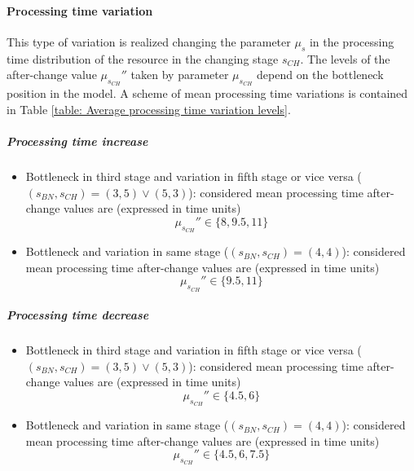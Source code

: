 \paragraph{Processing time variation}
This type of variation is realized changing the parameter $\mu_s$ in the processing time distribution of the resource in the changing stage $s_{CH}$. The levels of the after-change value $\mu_{s_{CH}}''$ taken by parameter $\mu_{s_{CH}}$ depend on the bottleneck position in the model. A scheme of mean processing time variations is contained in Table \ref{table: Average processing time variation levels}.
\subparagraph{Processing time increase} 
\begin{itemize}
\item Bottleneck in third stage and variation in fifth stage or vice versa ($(s_{BN},s_{CH})=(3,5)\vee(5,3)$): considered mean processing time after-change values are (expressed in time units)
\[\mu_{s_{CH}}''\in\{8,9.5,11\}\]
\item Bottleneck and variation in same stage ($(s_{BN},s_{CH})=(4,4)$): considered mean processing time after-change values are (expressed in time units)
\[\mu_{s_{CH}}''\in\{9.5,11\}\]
\end{itemize}
\subparagraph{Processing time decrease}
\begin{itemize}
\item Bottleneck in third stage and variation in fifth stage or vice versa ($(s_{BN},s_{CH})=(3,5)\vee(5,3)$): considered mean processing time after-change values are (expressed in time units)
\[\mu_{s_{CH}}''\in\{4.5,6\}\]
\item Bottleneck and variation in same stage ($(s_{BN},s_{CH})=(4,4)$): considered mean processing time after-change values are (expressed in time units)
\[\mu_{s_{CH}}''\in\{4.5,6,7.5\}\]
\end{itemize}
